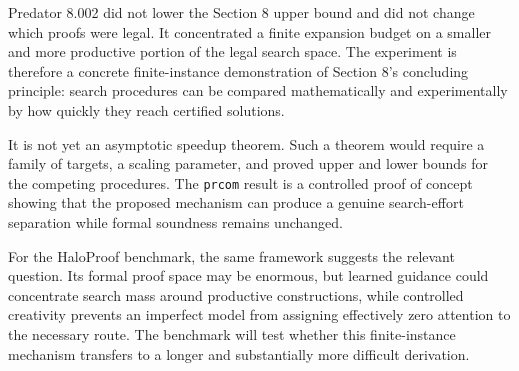 \documentclass[11pt]{article}
\newcommand{\prcom}{\texttt{prcom}}
\begin{document}
Predator 8.002 did not lower the Section 8 upper bound and did not
change which proofs were legal.  It concentrated a finite expansion
budget on a smaller and more productive portion of the legal search
space.  The experiment is therefore a concrete finite-instance
demonstration of Section 8's concluding principle: search procedures
can be compared mathematically and experimentally by how quickly they
reach certified solutions.

It is not yet an asymptotic speedup theorem.  Such a theorem would
require a family of targets, a scaling parameter, and proved upper and
lower bounds for the competing procedures.  The \prcom{} result is a
controlled proof of concept showing that the proposed mechanism can
produce a genuine search-effort separation while formal soundness
remains unchanged.

For the HaloProof benchmark, the same framework suggests the relevant
question.  Its formal proof space may be enormous, but learned guidance
could concentrate search mass around productive constructions, while
controlled creativity prevents an imperfect model from assigning
effectively zero attention to the necessary route.  The benchmark will
test whether this finite-instance mechanism transfers to a longer and
substantially more difficult derivation.
\end{document}
